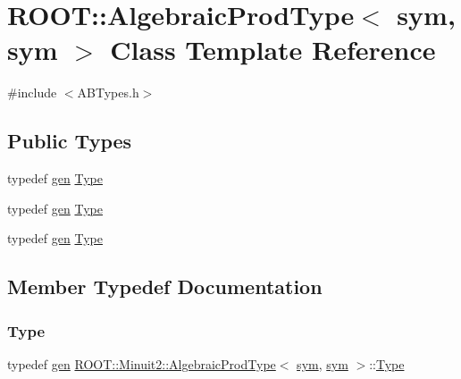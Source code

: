 \hypertarget{classROOT_1_1Minuit2_1_1AlgebraicProdType_3_01sym_00_01sym_01_4}{}\section{R\+O\+OT\+:\+:Algebraic\+Prod\+Type$<$ sym, sym $>$ Class Template Reference}
\label{classROOT_1_1Minuit2_1_1AlgebraicProdType_3_01sym_00_01sym_01_4}


{\ttfamily \#include $<$A\+B\+Types.\+h$>$}

\subsection*{Public Types}
\begin{DoxyCompactItemize}
\item 
typedef \mbox{\hyperlink{classROOT_1_1Minuit2_1_1gen}{gen}} \mbox{\hyperlink{classROOT_1_1Minuit2_1_1AlgebraicProdType_3_01sym_00_01sym_01_4_a0b02f8928c35c1a4580a0b80b4ed50a1}{Type}}
\item 
typedef \mbox{\hyperlink{classROOT_1_1Minuit2_1_1gen}{gen}} \mbox{\hyperlink{classROOT_1_1Minuit2_1_1AlgebraicProdType_3_01sym_00_01sym_01_4_a0b02f8928c35c1a4580a0b80b4ed50a1}{Type}}
\item 
typedef \mbox{\hyperlink{classROOT_1_1Minuit2_1_1gen}{gen}} \mbox{\hyperlink{classROOT_1_1Minuit2_1_1AlgebraicProdType_3_01sym_00_01sym_01_4_a0b02f8928c35c1a4580a0b80b4ed50a1}{Type}}
\end{DoxyCompactItemize}


\subsection{Member Typedef Documentation}
\mbox{\label{classROOT_1_1Minuit2_1_1AlgebraicProdType_3_01sym_00_01sym_01_4_a0b02f8928c35c1a4580a0b80b4ed50a1}} 
\subsubsection{\texorpdfstring{Type}{Type}\hspace{0.1cm}{\footnotesize\ttfamily [1/3]}}
{\footnotesize\ttfamily typedef \mbox{\hyperlink{classROOT_1_1Minuit2_1_1gen}{gen}} \mbox{\hyperlink{classROOT_1_1Minuit2_1_1AlgebraicProdType}{R\+O\+O\+T\+::\+Minuit2\+::\+Algebraic\+Prod\+Type}}$<$ \mbox{\hyperlink{classROOT_1_1Minuit2_1_1sym}{sym}}, \mbox{\hyperlink{classROOT_1_1Minuit2_1_1sym}{sym}} $>$\+::\mbox{\hyperlink{classROOT_1_1Minuit2_1_1AlgebraicProdType_3_01sym_00_01sym_01_4_a0b02f8928c35c1a4580a0b80b4ed50a1}{Type}}}

